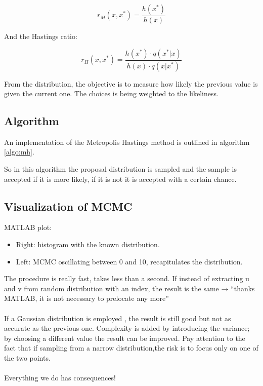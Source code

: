 $$r_M(x,x^*)=\frac{h(x^*)}{h(x)}$$

And the Hastings ratio:

$$r_H(x,x^*)=\frac{h(x^*)\cdot q(x^*|x)}{h(x)\cdot q(x|x^*)}$$

From the distribution, the objective is to measure how likely the previous value is given the current one.
The choices is being weighted to the likeliness.

  \subsection{Algorithm}
  An implementation of the Metropolis Hastings method is outlined in algorithm \ref{algo:mh}.

  

  So in this algorithm the proposal distribution is sampled and the sample is accepted if it is more likely, if it is not it is accepted with a certain chance.


  \subsection{Visualization of MCMC}
  MATLAB plot:

  \begin{multicols}{2}
    \begin{itemize}
      \item Right: histogram with the known distribution.
      \item Left: MCMC oscillating between 0 and 10, recapitulates the distribution.
    \end{itemize}
  \end{multicols}

  The procedure is really fast, takes less than a second. If instead of
  extracting u and v from random distribution with an index, the result is
  the same → ``thanks MATLAB, it is not necessary to prelocate any more''
  \\
  \\
  \noindent
  If a Gaussian distribution is employed , the result is still good but not
  as accurate as the previous one. Complexity is added by introducing
  the variance; by choosing a different value the result can be improved.
  Pay attention to the fact that if sampling from a narrow distribution,the risk is to focus only on one of the two points.
  \\
  \\
  \noindent
  Everything we do has consequences!

